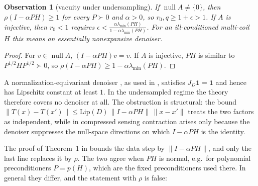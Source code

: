 \documentclass[11pt]{article}
\newtheorem{observation}[theorem]{Observation}
\theoremstyle{definition}
\theoremstyle{remark}
\newcommand{\norm}[1]{\lVert #1\rVert}
\newcommand{\nul}{\operatorname{null}}
\newcommand{\lmin}{\lambda_{\min}}
\begin{document}
\begin{observation}[vacuity under undersampling]\label{obs:vacuous}
If $\nul A\neq\{0\}$, then $\rho(I-\alpha PH)\geq1$ for every $P\succ0$ and $\alpha>0$, so $r_0,q\geq1+\epsilon>1$.
If $A$ is injective, then $r_0<1$ requires $\epsilon<\frac{\alpha\lmin(PH)}{1-\alpha\lmin(PH)}$. For an
ill-conditioned multi-coil $H$ this means an essentially nonexpansive denoiser.
\end{observation}
\begin{proof}
For $v\in\nul A$, $(I-\alpha PH)v=v$. If $A$ is injective, $PH$ is similar to $P^{1/2}HP^{1/2}\succ0$, so
$\rho(I-\alpha PH)\geq1-\alpha\lmin(PH)$.
\end{proof}

A normalization-equivariant denoiser \cite{herbreteau2023}, as used in \cite{hong2024p2np}, satisfies
$J_D\mathbf 1=\mathbf 1$ and hence has Lipschitz constant at least $1$. In the undersampled regime the theory
therefore covers no denoiser at all. The obstruction is structural: the bound
$\norm{T(x)-T(x')}\leq\mathrm{Lip}(D)\,\norm{I-\alpha PH}\,\norm{x-x'}$ treats the two factors as independent,
while in compressed sensing contraction arises only because the denoiser suppresses the null-space directions on
which $I-\alpha PH$ is the identity.

The proof of Theorem~1 in \cite{hong2024p2np} bounds the data step by $\norm{I-\alpha PH}$, and only the last line
replaces it by $\rho$. The two agree when $PH$ is normal, e.g.\ for polynomial preconditioners $P=p(H)$, which
are the fixed preconditioners used there. In general they differ, and the statement with $\rho$ is false:
\end{document}
